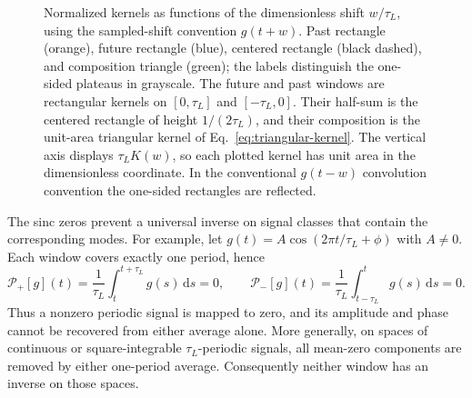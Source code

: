 \documentclass[12pt]{article}
\begin{document}
\begin{figure}[ht]
  \centering
  \caption{Normalized kernels as functions of the dimensionless shift $w/\tau_L$, using the sampled-shift convention $g(t+w)$. Past rectangle (orange), future rectangle (blue), centered rectangle (black dashed), and composition triangle (green); the labels distinguish the one-sided plateaus in grayscale. The future and past windows are rectangular kernels on $[0,\tau_L]$ and $[-\tau_L,0]$. Their half-sum is the centered rectangle of height $1/(2\tau_L)$, and their composition is the unit-area triangular kernel of Eq.~\eqref{eq:triangular-kernel}. The vertical axis displays $\tau_L K(w)$, so each plotted kernel has unit area in the dimensionless coordinate. In the conventional $g(t-w)$ convolution convention the one-sided rectangles are reflected.}
  \label{fig:window-kernels}
\end{figure}

The sinc zeros prevent a universal inverse on signal classes that contain the corresponding modes. For example, let $g(t)=A\cos(2\pi t/\tau_L+\phi)$ with $A\ne0$. Each window covers exactly one period, hence
\begin{equation}
  \mathcal{P}_{+}[g](t)
  =\frac{1}{\tau_L}\int_t^{t+\tau_L}g(s)\,\mathrm{d}s=0,
  \qquad
  \mathcal{P}_{-}[g](t)
  =\frac{1}{\tau_L}\int_{t-\tau_L}^{t}g(s)\,\mathrm{d}s=0.
  \label{eq:zero-mode-example}
\end{equation}
Thus a nonzero periodic signal is mapped to zero, and its amplitude and phase cannot be recovered from either average alone. More generally, on spaces of continuous or square-integrable $\tau_L$-periodic signals, all mean-zero components are removed by either one-period average. Consequently neither window has an inverse on those spaces.
\end{document}
